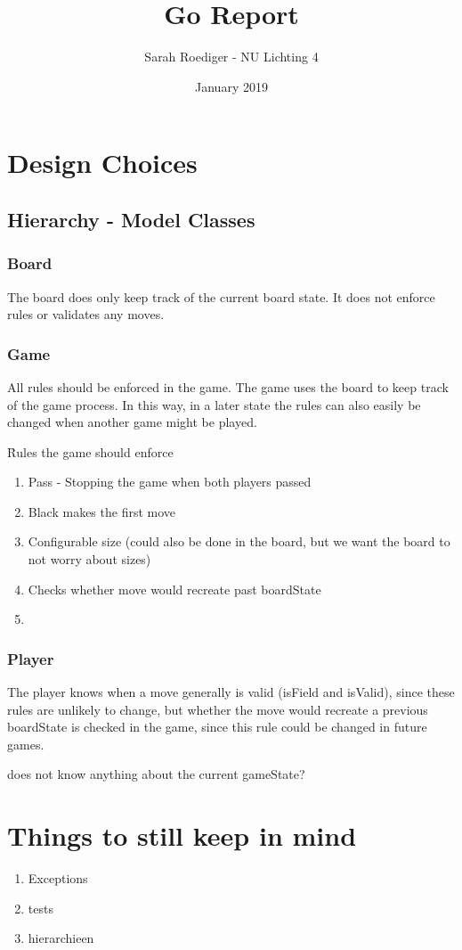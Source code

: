 \documentclass{article}
\title{Go Report}
\date{January 2019}
\begin{document}
\author{Sarah Roediger - NU Lichting 4} 
\maketitle

\section{Design Choices}

\subsection{Hierarchy - Model Classes}

\subsubsection{Board}

The board does only keep track of the current board state. It does not enforce rules or validates any moves.

\subsubsection{Game}

All rules should be enforced in the game. The game uses the board to keep track of the game process. In this way, in a later state the rules can also easily be changed when another game might be played.



\r
Rules the game should enforce
\begin{enumerate} 

	\item Pass - Stopping the game when both players passed
	\item Black makes the first move
	\item Configurable size (could also be done in the board, but we want the board to not worry about sizes)
	\item Checks whether move would recreate past boardState
	\item 

\end{enumerate}

\subsubsection{Player}

The player knows when a move generally is valid (isField and isValid), since these rules are unlikely to change, but whether the move would recreate a previous boardState is checked in the game, since this rule could be changed in future games.

 does not know anything about the current gameState?



\section{Things to still keep in mind}

\begin{enumerate}

	\item Exceptions 
	\item tests
	\item hierarchieen

\end{enumerate}
\end{document}
